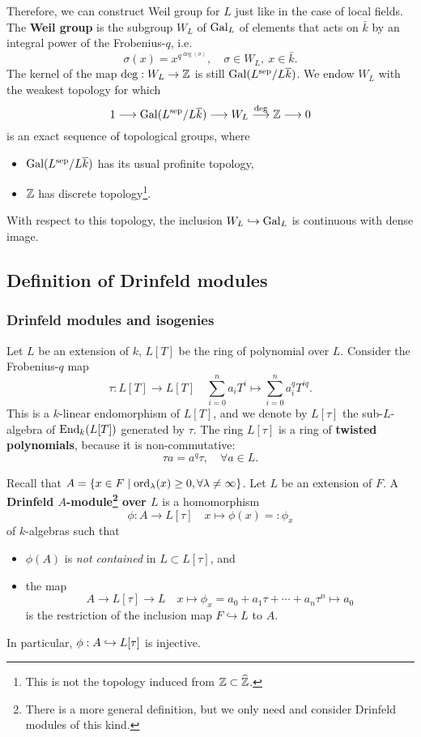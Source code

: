 \documentclass{article}
\newcommand{\sep}{\mathrm{sep}}
\begin{document}
Therefore, we can construct Weil group for $L$ just like in the case of local fields.
The \textbf{Weil group} is the subgroup $W_L$ of $\operatorname{Gal}_L$ of elements that acts on $\bar{k}$ by an integral power of the Frobenius-$q$, i.e. \[\sigma(x) = x^{q^{\deg(\sigma)}},\quad \sigma\in W_L,\ x\in\bar{k}.\]
The kernel of the map $\deg : W_L\to\mathbb{Z}$ is still $\gal(L^\sep/L\bar{k})$.
We endow $W_L$ with the weakest topology for which
\[1\longrightarrow \gal(L^\sep/L\bar{k})\longrightarrow W_L\stackrel{\deg}{\longrightarrow} \Z\longrightarrow0\]
is an exact sequence of topological groups,
where \begin{itemize}
    \item $\gal(L^\sep/L\bar{k})$ has its usual profinite topology,
    \item $\mathbb{Z}$ has discrete topology\footnote{This is not the topology induced from $\mathbb{Z}\subset \widehat{\mathbb{Z}}$.}.
\end{itemize}
With respect to this topology,
the inclusion $W_L\hookrightarrow \operatorname{Gal}_L$ is continuous with dense image.

\subsection{Definition of Drinfeld modules}
\subsubsection{Drinfeld modules and isogenies}

Let $L$ be an extension of $k$, $L[T]$ be the ring of polynomial over $L$.
Consider the Frobenius-$q$ map \[\tau : L[T]\to L[T]\quad \sum_{i = 0}^n a_iT^i\mapsto \sum_{i = 0}^n a_i^qT^{iq}.\]
This is a $k$-linear endomorphism of $L[T]$,
and we denote by $L[\tau]$ the sub-$L$-algebra of $\operatorname{End}_{k}(L[T])$ generated by $\tau$.
The ring $L[\tau]$ is a ring of \textbf{twisted polynomials},
because it is non-commutative:
\[\tau a = a^q\tau,\quad \forall a\in L.\]


Recall that $A = \{x\in F\mid \operatorname{ord}_\lambda(x)\ge 0, \forall \lambda\ne\infty\}$.
Let $L$ be an extension of $F$.
A \textbf{Drinfeld $A$-module\footnote{
    There is a more general definition, but we only need and consider Drinfeld modules of this kind.
} over $L$} is a homomorphism
\[\phi : A\to L[\tau]\quad x\mapsto \phi(x) =: \phi_x\]
of $k$-algebras such that
\begin{itemize}
    \item $\phi(A)$ is \textit{not contained} in $L\subset L[\tau]$, and
    \item the map \[A\to L[\tau]\to L\quad x\mapsto \phi_x = a_0 + a_1\tau + \cdots + a_n\tau^n\mapsto a_0\] is the restriction of the inclusion map $F\hookrightarrow L$ to $A$.
\end{itemize}
In particular, $\phi : A\hookrightarrow L[\tau]$ is injective.
\end{document}
